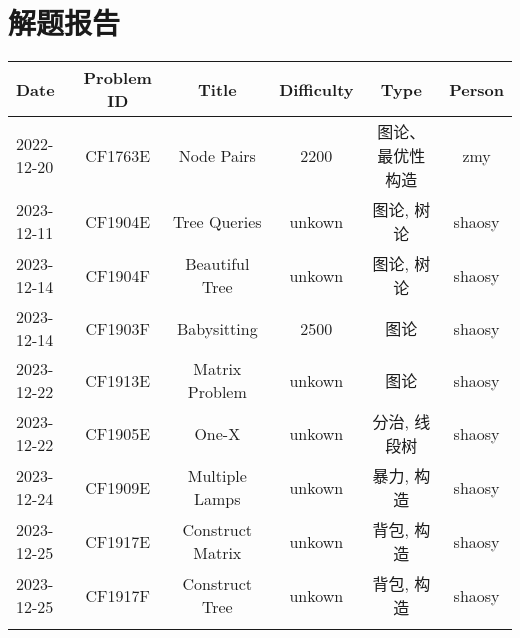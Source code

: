 \chapter{解题报告}
\begin{center}
\begin{longtable}{l c c c c c }

Date & Problem ID & Title & Difficulty & Type & Person   \\ 
\hline
2022-12-20 & CF1763E & Node Pairs & 2200 & 图论、最优性构造 & zmy  \\
2023-12-11 & CF1904E & Tree Queries & unkown & 图论, 树论 & shaosy \\
2023-12-14 & CF1904F & Beautiful Tree & unkown & 图论, 树论 & shaosy \\
2023-12-14 & CF1903F & Babysitting & 2500 & 图论 & shaosy \\
2023-12-22 & CF1913E & Matrix Problem & unkown & 图论 & shaosy \\
2023-12-22 & CF1905E & One-X & unkown & 分治, 线段树 & shaosy \\
2023-12-24 & CF1909E & Multiple Lamps & unkown & 暴力, 构造 & shaosy \\
2023-12-25 & CF1917E & Construct Matrix & unkown & 背包, 构造 & shaosy \\
2023-12-25 & CF1917F & Construct Tree & unkown & 背包, 构造 & shaosy \\
\hline

\label{tab:practice_index}
\end{longtable}
\end{center}

